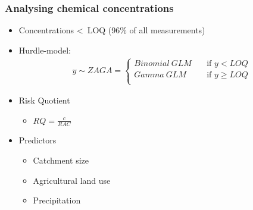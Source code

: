 \documentclass[
	12pt
	]{beamer}
\begin{document}
\begin{frame}
\frametitle{Analysing chemical concentrations}
	\begin{itemize}
		\pause
		\item Concentrations \textless~LOQ (96\% of all measurements)
		\pause
		\item Hurdle-model: 
			\begin{align*}
			y \sim ZAGA = 
			  \begin{cases}
			    Binomial~GLM   & \quad  \text{if } y < LOQ \\
			    Gamma~GLM & \quad \text{if } y \ge LOQ \\
			  \end{cases}
			\end{align*}
		\pause
		\item Risk Quotient
			\begin{itemize}
				\item \large $RQ = \frac{c}{RAC}$
			\end{itemize}
		\pause
		\item Predictors
		    \begin{itemize}
				\item Catchment size 
				\item Agricultural land use
				\item Precipitation
			\end{itemize}
	\end{itemize}
\end{frame}
\end{document}
